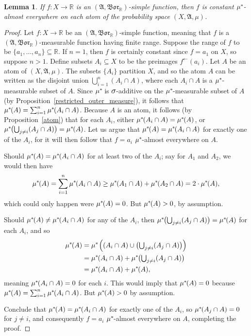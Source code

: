 \documentclass[
twoside=true,
paper=letter,
fontsize=11pt,
pagesize=auto,
leqno,
openany,
headsepline,
overfullrule,
]{scrbook}
\theoremstyle{plain}
\theoremstyle{plain}
\newtheorem{lemma}[thm]{Lemma}
\theoremstyle{definition}
\theoremstyle{bfnoteitalic}
\theoremstyle{bfnoteroman}
\newcommand{\sigalg}[1]{\mathfrak{#1}}
\newcommand{\borel}{\mathfrak{Bor}}
\newcommand{\textsigma}{\hbox{\large{$\sigma$}}\kern-1pt}
\newcommand{\preimage}[1]{#1^{\leftarrow}}
\newcommand{\R}{\mathbb{R}}
\newcommand{\meets}{\cap}
\newcommand{\sigmaalgebra}{\sigalg{A}}
\newcommand{\kernast}{\ast\kern-1pt}
\newcommand{\Pstar}{\measure^\kernast}
\newcommand{\function}{f}
\newcommand{\measurespace}{X}
\newcommand{\measure}{\mu}
\begin{document}
\begin{lemma}\label{atom_lemma}
If $\function:\measurespace\to\R$ is an $(\sigmaalgebra, \borel_\R)$-simple function, then $\function$ is constant 
$\Pstar$-almost everywhere
on each atom of the probability space $(\measurespace, \sigmaalgebra,\measure)$.
\end{lemma}

\begin{proof}
Let $\function:\measurespace\to\R$ be an $(\sigmaalgebra, \borel_\R)$-simple function, meaning that $\function$ is a $(\sigmaalgebra,\borel_\R)$\hyp{}measurable function having finite range. Suppose the range of $\function$ to be $\{a_1,\ldots,a_n\}\subseteq\R$. If $n=1$, then $\function$ is certainly constant since $\function=a_1$ on $\measurespace$, so suppose $n>1$.  Define subsets 
$A_i\subseteq\measurespace$ to be the preimages $\preimage{\function}(a_i)$.  
Let $A$ be an atom of $(\measurespace, \sigmaalgebra,\measure)$. 
The subsets $\{A_i\}$ partition $\measurespace$, and so the atom $A$ can be written as the disjoint union 
$\bigcup_{i=1}^n(A_i\meets A)$, where
\newcommand{\asubimeetsa}{A_i\meets A}
each $\asubimeetsa$ is a $\Pstar$-measurable subset of $A$. 
Since $\Pstar$ is $\textsigma$-additive on the $\Pstar$-measurable subset of $A$ (by Proposition~\ref{restricted_outer_measure}), it follows that 
$\Pstar(A)=\sum_{i=1}^n\Pstar(\asubimeetsa)$.
Because $A$ is an atom, it follows (by Proposition~\ref{atom}) that for each $A_i$, either $\Pstar(\asubimeetsa)=\Pstar(A)$, or 
$\Pstar\bigl(\bigcup_{j\neq i}(A_j\meets A)\bigr) = \Pstar(A)$.
Let us argue that $\Pstar(A) = \Pstar(\asubimeetsa)$ for exactly one of the $A_i$, for it will then follow that $\function = a_i$ $\Pstar$-almost everywhere on $A$.

Should $\Pstar(A) = \Pstar(\asubimeetsa)$ for at least two of the $A_i$; say for $A_1$ and $A_2$, we would then have
\[
\Pstar(A)=\sum_{i=1}^n \Pstar(\asubimeetsa)
\geq
\Pstar(A_1\meets A) + \Pstar(A_2\meets A)
=
2\cdot\Pstar(A),
\]
which could only happen were $\Pstar(A)=0$. But $\Pstar(A)>0$, by assumption.

Should $\Pstar(A) \neq \Pstar(\asubimeetsa)$ for any of the $A_i$, then 
$\Pstar\bigl(\bigcup_{j\neq i}(A_j\meets A)\bigr) = \Pstar(A)$ for each $A_i$, and so
\begin{align*}
\Pstar(A)
& = \Pstar\left((\asubimeetsa)
\cup
\bigl({\textstyle{\bigcup_{j\neq i}}}(A_j\meets A)\bigr)\right)\\
& = \Pstar(\asubimeetsa)
+
\Pstar\bigl( {\textstyle{\bigcup_{j\neq i}}}(A_j\meets A) \bigr)\\
& = \Pstar(\asubimeetsa) + \Pstar(A),\\
\end{align*}
meaning $\Pstar(\asubimeetsa) = 0$ for each $i$. This would imply that $\Pstar(A) = 0$ because 
$\Pstar(A)=\sum_{i=1}^n\Pstar(\asubimeetsa)$. But $\Pstar(A)>0$ by assumption.

Conclude that $\Pstar(A) = \Pstar(\asubimeetsa)$ for exactly one of the $A_i$, so $\Pstar(A_j\meets A)=0$ for $j\neq i$, and consequently $\function=a_i$ $\Pstar$-almost everywhere on $A$, completing the proof.
\end{proof}
\end{document}
